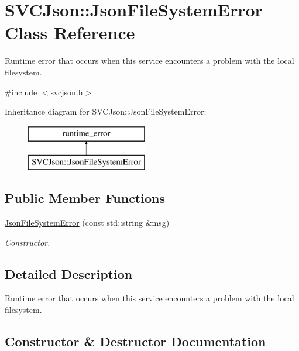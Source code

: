 \hypertarget{class_s_v_c_json_1_1_json_file_system_error}{}\section{S\+V\+C\+Json\+::Json\+File\+System\+Error Class Reference}
\label{class_s_v_c_json_1_1_json_file_system_error}


Runtime error that occurs when this service encounters a problem with the local filesystem.  




{\ttfamily \#include $<$svcjson.\+h$>$}

Inheritance diagram for S\+V\+C\+Json\+::Json\+File\+System\+Error\+:\begin{figure}[H]
\begin{center}
\leavevmode
\includegraphics[height=2.000000cm]{class_s_v_c_json_1_1_json_file_system_error}
\end{center}
\end{figure}
\subsection*{Public Member Functions}
\begin{DoxyCompactItemize}
\item 
\mbox{\hyperlink{class_s_v_c_json_1_1_json_file_system_error_ad0a5bde445d1d5e9b0215d30c94f5ad2}{Json\+File\+System\+Error}} (const std\+::string \&msg)
\begin{DoxyCompactList}\small\item\em Constructor. \end{DoxyCompactList}\end{DoxyCompactItemize}


\subsection{Detailed Description}
Runtime error that occurs when this service encounters a problem with the local filesystem. 



\subsection{Constructor \& Destructor Documentation}
\mbox{\label{class_s_v_c_json_1_1_json_file_system_error_ad0a5bde445d1d5e9b0215d30c94f5ad2}} 
